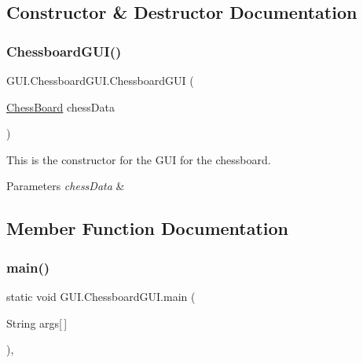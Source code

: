 \subsection{Constructor \& Destructor Documentation}
\mbox{\label{class_g_u_i_1_1_chessboard_g_u_i_a54614b37f2b48869a626ed8358719682}} 
\subsubsection{\texorpdfstring{Chessboard\+G\+U\+I()}{ChessboardGUI()}}
{\footnotesize\ttfamily G\+U\+I.\+Chessboard\+G\+U\+I.\+Chessboard\+G\+UI (\begin{DoxyParamCaption}\item[{\hyperlink{class_game_1_1_chess_board}{Chess\+Board}}]{chess\+Data }\end{DoxyParamCaption})\hspace{0.3cm}{\ttfamily [inline]}}

This is the constructor for the G\+UI for the chessboard. 
\begin{DoxyParams}{Parameters}
{\em chess\+Data} & \\
\hline
\end{DoxyParams}


\subsection{Member Function Documentation}
\mbox{\label{class_g_u_i_1_1_chessboard_g_u_i_a2ed2bd7b9e65ae8a4e92c27e76b0c14f}} 
\subsubsection{\texorpdfstring{main()}{main()}}
{\footnotesize\ttfamily static void G\+U\+I.\+Chessboard\+G\+U\+I.\+main (\begin{DoxyParamCaption}\item[{String}]{args\mbox{[}$\,$\mbox{]} }\end{DoxyParamCaption})\hspace{0.3cm}{\ttfamily [inline]}, {\ttfamily [static]}}

